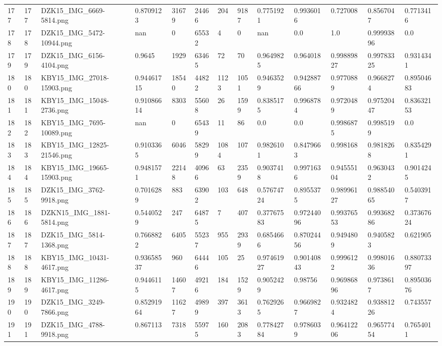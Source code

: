 \documentclass[11pt, a4paper, twoside]{report}
\begin{document}
\begin{longtable}[c]{@{}lllllllllllll@{}}
177 & 177 & DZK15\_IMG\_6669-5814.png & 0.8709123 & 31679 & 24466 & 204 & 9187 & 0.7751921 & 0.9936016 & 0.727008 & 0.8567047 & 0.7713416 \\
178 & 178 & DZK15\_IMG\_5472-10944.png & nan & 0 & 65532 & 4 & 0 & nan & 0.0 & 1.0 & 0.99993896 & 0.0 \\
179 & 179 & DZK15\_IMG\_6156-4104.png & 0.9645 & 1929 & 63465 & 72 & 70 & 0.9649825 & 0.964018 & 0.99889827 & 0.99783325 & 0.9314341 \\
180 & 180 & KBY15\_IMG\_27018-15903.png & 0.94461715 & 18540 & 44822 & 1123 & 1051 & 0.9463529 & 0.94288766 & 0.9770889 & 0.9668274 & 0.89504683 \\
181 & 181 & KBY15\_IMG\_15048-2736.png & 0.91086614 & 8303 & 55608 & 26 & 1599 & 0.8385175 & 0.9968784 & 0.9720489 & 0.97520447 & 0.83632153 \\
182 & 182 & KBY15\_IMG\_7695-10089.png & nan & 0 & 65439 & 11 & 86 & 0.0 & 0.0 & 0.9986875 & 0.9985199 & 0.0 \\
183 & 183 & KBY15\_IMG\_12825-21546.png & 0.9103365 & 6046 & 58299 & 1084 & 107 & 0.9826101 & 0.8479663 & 0.998168 & 0.9818268 & 0.8354291 \\
184 & 184 & KBY15\_IMG\_19665-15903.png & 0.9481571 & 22148 & 40966 & 63 & 2359 & 0.9037418 & 0.9971636 & 0.94555104 & 0.9630432 & 0.9014245 \\
185 & 185 & DZK15\_IMG\_3762-9918.png & 0.7016289 & 883 & 63902 & 103 & 648 & 0.57674724 & 0.8955375 & 0.98996127 & 0.98854065 & 0.5403917 \\
186 & 186 & DZKN15\_IMG\_1881-5814.png & 0.5440529 & 247 & 64875 & 7 & 407 & 0.37767583 & 0.97244096 & 0.99376553 & 0.99368286 & 0.37367624 \\
187 & 187 & DZK15\_IMG\_5814-1368.png & 0.7668822 & 6405 & 55237 & 955 & 2939 & 0.6854666 & 0.87024456 & 0.9494809 & 0.9405823 & 0.621905 \\
188 & 188 & KBY15\_IMG\_10431-4617.png & 0.93658537 & 960 & 64446 & 105 & 25 & 0.97461927 & 0.90140843 & 0.9996122 & 0.99801636 & 0.88073397 \\
189 & 189 & KBY15\_IMG\_11286-4617.png & 0.9446115 & 14607 & 49216 & 184 & 1529 & 0.9052429 & 0.98756 & 0.96986896 & 0.9738617 & 0.89503676 \\
190 & 190 & DZK15\_IMG\_3249-7866.png & 0.85291964 & 11627 & 49899 & 397 & 3613 & 0.7629265 & 0.9669827 & 0.9324824 & 0.93881226 & 0.743557 \\
191 & 191 & DZK15\_IMG\_4788-9918.png & 0.867113 & 7318 & 55975 & 160 & 2083 & 0.77842784 & 0.9786039 & 0.96412206 & 0.96577454 & 0.7654011 \\

\end{longtable}
\end{document}
